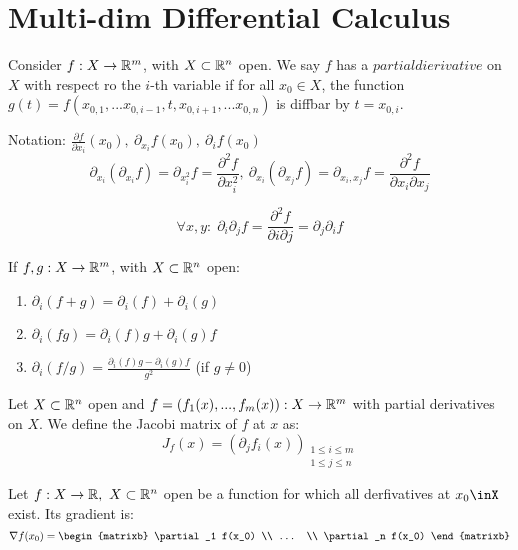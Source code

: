 \chapter{Multi-dim Differential Calculus}

\begin{definition}
	Consider $f: X \to \mathbb{R}^m$, with $X \subset \mathbb{R}^n$ open.
	We say $f$ has a $partial dierivative$ on $X$ with respect ro the $i$-th variable if for all $x_0 \in X$, the function $g(t) = f(x_{0,1},...x_{0,i-1},t,x_{0,i+1},...x_{0,n})$ is diffbar by $t = x_{0,i}$.
	
	Notation: $\frac{\partial f}{\partial x_i}(x_0), \ \partial_{x_i}f(x_0), \ \partial_if(x_0)$
	$$\partial_{x_i}(\partial_{x_i} f) = \partial_{x_i^2}f = \frac{\partial^2 f}{\partial x_i^2}, \ \partial_{x_i}(\partial_{x_j} f) = \partial_{x_i, x_j}f = \frac{\partial^2 f}{\partial x_i \partial x_j}$$
\end{definition}

\begin{theorem}
	$$\forall x,y:\; \partial_i \partial_j f = \frac{\partial^2 f}{\partial i \partial j} = \partial_j \partial_i f$$
\end{theorem}

\begin{proposition}
	If $f,g: X \to \mathbb{R}^m$, with $X \subset \mathbb{R}^n$ open:
	\begin{enumerate}
		\item $\partial_i(f+g) = \partial_i(f) + \partial_i(g)$
		\item $\partial_i(fg) = \partial_i(f)g + \partial_i(g)f$
		\item $\partial_i(f/g) = \frac{\partial_i(f)g - \partial_i(g)f}{g^2}$ (if $g \neq 0$)
	\end{enumerate}
\end{proposition}

\begin{definition}
	Let $X \subset \mathbb{R}^n$ open and $f=(f_1(x), ..., f_m(x)): X \to \mathbb{R}^m$ with partial derivatives on $X$.
	We define the Jacobi matrix of $f$ at $x$ as:
	$$J_f(x) = (\partial_j f_i(x))_{\substack{1 \leq i \leq m \\ 1 \leq j \leq n}}$$
\end{definition}

\begin{definition}[Gradiant]
	Let $f: X \to \mathbb{R}, \  X \subset \mathbb{R}^n $ open be a function for which all derfivatives at $x_0\inX$ exist.
	Its gradient is:
	$$\nabla f(x_0) = \begin{matrixb} \partial_1 f(x_0) \\ ... \\ \partial_n f(x_0) \end{matrixb}$$
\end{definition}


